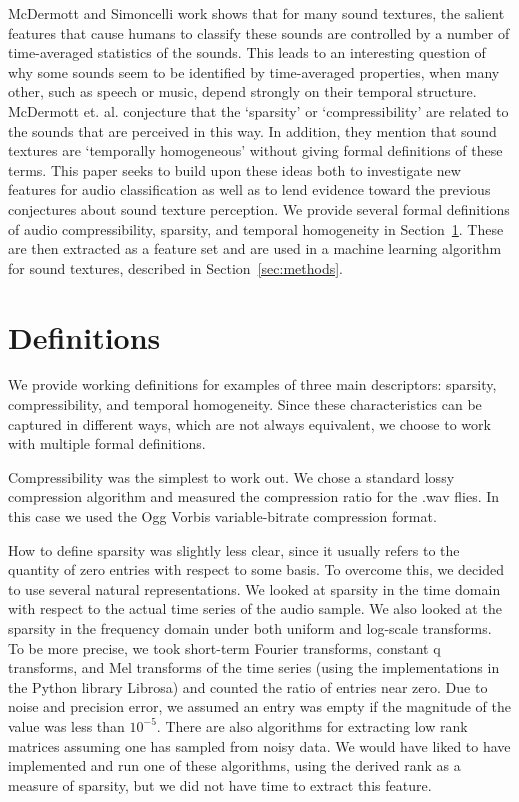 \documentclass{sig-alternate-05-2015}
\begin{document}
McDermott and Simoncelli work shows that for many sound textures, the salient features that cause humans to classify these sounds are controlled by a number of time-averaged statistics of the sounds\cite{McDermott2011926, mcdermott2013summary}. This leads to an interesting question of why some sounds seem to be identified by time-averaged properties, when many other, such as speech or music, depend strongly on their temporal structure. McDermott et. al. conjecture that the `sparsity' or `compressibility' are related to the sounds that are perceived in this way. In addition, they mention that sound textures are `temporally homogeneous' without giving formal definitions of these terms. This paper seeks to build upon these ideas both to investigate new features for audio classification as well as to lend evidence toward the previous conjectures about sound texture perception. We provide several formal definitions of audio compressibility, sparsity, and temporal homogeneity in Section~\ref{sec:definitions}. These are then extracted as a feature set and are used in a machine learning algorithm for sound textures, described in Section~\ref{sec:methods}.

\section{Definitions}
\label{sec:definitions}
We provide working definitions for examples of three main descriptors: sparsity, compressibility, and temporal homogeneity. Since these characteristics can be captured in different ways, which are not always equivalent, we choose to work with multiple formal definitions.

Compressibility was the simplest to work out. We chose a standard lossy compression algorithm and measured the compression ratio for the .wav flies. In this case we used the Ogg Vorbis variable-bitrate compression format.

How to define sparsity was slightly less clear, since it usually refers to the quantity of zero entries with respect to some basis. To overcome this, we decided to use several natural representations. We looked at sparsity in the time domain with respect to the actual time series of the audio sample. We also looked at the sparsity in the frequency domain under both uniform and log-scale transforms. To be more precise, we took short-term Fourier transforms, constant q transforms, and Mel transforms of the time series (using the implementations in the Python library Librosa\cite{mcfee2015librosa}) and counted the ratio of entries near zero. Due to noise and precision error, we assumed an entry was empty if the magnitude of the value was less than $10^{-5}$. There are also algorithms for extracting low rank matrices assuming one has sampled from noisy data\cite{negahban2011estimation}. We would have liked to have implemented and run one of these algorithms, using the derived rank as a measure of sparsity, but we did not have time to extract this feature.
\end{document}
